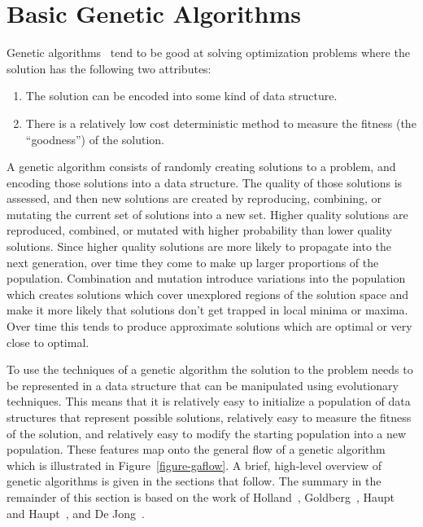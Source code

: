 \section{Basic Genetic Algorithms}

Genetic algorithms~\cite{Holland1992, goldberg1989genetic,
fogel2000evolutionary, haupt2004practical} tend to be good at solving
optimization problems where the solution has the following two attributes:

\begin{enumerate}
  \item {The solution can be encoded into some kind of data structure.}
  \item {There is a relatively low cost deterministic method to measure the
  fitness (the ``goodness'') of the solution.}
\end{enumerate}

A genetic algorithm consists of randomly creating solutions to a problem, and
encoding those solutions into a data structure. The quality of those solutions
is assessed, and then new solutions are created by reproducing, combining, or
mutating the current set of solutions into a new set. Higher quality solutions
are reproduced, combined, or mutated with higher probability than lower quality
solutions. Since higher quality solutions are more likely to propagate into the
next generation, over time they come to make up larger proportions of the
population. Combination and mutation introduce variations into the population
which creates solutions which cover unexplored regions of the solution space and
make it more likely that solutions don't get trapped in local minima or maxima.
Over time this tends to produce approximate solutions which are optimal or very
close to optimal.

To use the techniques of a genetic algorithm the solution to the problem needs
to be represented in a data structure that can be manipulated using evolutionary
techniques. This means that it is relatively easy to initialize a population of
data structures that represent possible solutions, relatively easy to measure
the fitness of the solution, and relatively easy to modify the starting
population into a new population. These features map onto the general flow of a
genetic algorithm which is illustrated in Figure~\ref{figure-gaflow}. A brief,
high-level overview of genetic algorithms is given in the sections that follow.
The summary in the remainder of this section is based on the work of
Holland~\cite{Holland1992}, Goldberg~\cite{goldberg1989genetic}, Haupt and
Haupt~\cite{haupt2004practical}, and De Jong~\cite{dejong2006evolutionary}.

